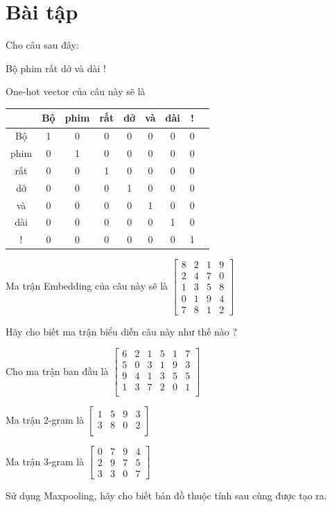 \section{Bài tập}
\begin{exer}
Cho câu sau đây:

Bộ phim rất dở và dài !

One-hot vector của câu này sẽ là
\begin{table}[!h]
    \centering
    \begin{tabular}{ |c|c|c|c|c|c|c|c|c| }
    \hline
         & Bộ & phim & rất & dở & và & dài & ! \\
    \hline
        Bộ & 1 & 0 & 0 & 0 & 0 & 0 & 0 \\
        phim & 0 & 1 & 0 & 0 & 0 & 0& 0 \\
        rất & 0 & 0 & 1 & 0 & 0 & 0 & 0 \\
        dở & 0 & 0 & 0 & 1 & 0 & 0 & 0 \\
        và & 0 & 0 & 0 & 0 & 1 & 0 & 0 \\
        dài & 0 & 0 & 0 & 0 & 0 & 1 & 0 \\
        ! & 0 & 0 & 0 & 0 & 0 & 0 & 1 \\
    \hline
    \end{tabular}
\end{table}

Ma trận Embedding của câu này sẽ là
$\begin{bmatrix}
    8 & 2 & 1 & 9 \\
    2 & 4 & 7 & 0 \\
    1 & 3 & 5 & 8 \\
    0 & 1 & 9 & 4 \\
    7 & 8 & 1 & 2
\end{bmatrix}$

Hãy cho biết ma trận biểu diễn câu này như thế nào ?
\end{exer}

\begin{exer}
Cho ma trận ban đầu là
$\begin{bmatrix}
    6 & 2 & 1 & 5 & 1 & 7 \\
    5 & 0 & 3 & 1 & 9 & 3 \\
    9 & 4 & 1 & 3 & 5 & 5 \\
    1 & 3 & 7 & 2 & 0 & 1 \\
\end{bmatrix}$

Ma trận 2-gram là
$\begin{bmatrix}
    1 & 5 & 9 & 3 \\
    3 & 8 & 0 & 2 \\
\end{bmatrix}$

Ma trận 3-gram là
$\begin{bmatrix}
    0 & 7 & 9 & 4 \\
    2 & 9 & 7 & 5 \\
    3 & 3 & 0 & 7
\end{bmatrix}$

Sử dụng Maxpooling, hãy cho biết bản đồ thuộc tính sau cùng được tạo ra.
\end{exer}


